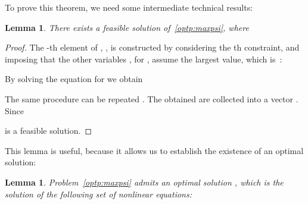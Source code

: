 \documentclass[a4paper,notitlepage,onecolumn]{article}
\newtheorem{lemma}[theorem]{Lemma}
\numberwithin{equation}{section}
\begin{document}
To prove this theorem, we need some intermediate technical results:

\begin{lemma}
\label{lemma:psi-bound}
There exists a feasible solution  of~\eqref{optp:maxpsi}, where

\end{lemma}
\begin{proof}
The -th element of , , is constructed by considering the th constraint, and imposing that the other variables , for , assume
the largest value, which is~:

By solving the equation for  we obtain

The same procedure can be repeated . The  obtained are collected into a vector . Since

 is a feasible solution.
\end{proof}
This lemma is useful, because it allows us to establish the
existence of an optimal solution:
\begin{lemma} \label{theo:OPsolutions}
Problem~\eqref{optp:maxpsi} admits an optimal solution , which is the solution of the following set of nonlinear equations:

\end{lemma}
\end{document}
